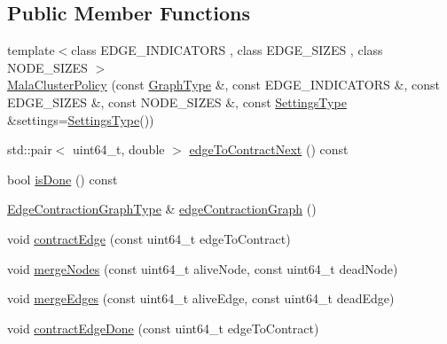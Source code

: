 \subsection*{Public Member Functions}
\begin{DoxyCompactItemize}
\item 
{\footnotesize template$<$class E\+D\+G\+E\+\_\+\+I\+N\+D\+I\+C\+A\+T\+O\+RS , class E\+D\+G\+E\+\_\+\+S\+I\+Z\+ES , class N\+O\+D\+E\+\_\+\+S\+I\+Z\+ES $>$ }\\\hyperlink{classnifty_1_1graph_1_1agglo_1_1MalaClusterPolicy_a764281b5b0b47bdec55ec8ab031100aa}{Mala\+Cluster\+Policy} (const \hyperlink{classnifty_1_1graph_1_1agglo_1_1MalaClusterPolicy_ae2696b85f3f04787282e003bead20a5d}{Graph\+Type} \&, const E\+D\+G\+E\+\_\+\+I\+N\+D\+I\+C\+A\+T\+O\+RS \&, const E\+D\+G\+E\+\_\+\+S\+I\+Z\+ES \&, const N\+O\+D\+E\+\_\+\+S\+I\+Z\+ES \&, const \hyperlink{structnifty_1_1graph_1_1agglo_1_1MalaClusterPolicy_1_1SettingsType}{Settings\+Type} \&settings=\hyperlink{structnifty_1_1graph_1_1agglo_1_1MalaClusterPolicy_1_1SettingsType}{Settings\+Type}())
\item 
std\+::pair$<$ uint64\+\_\+t, double $>$ \hyperlink{classnifty_1_1graph_1_1agglo_1_1MalaClusterPolicy_a8b87f155261b8196cad0e301af5c58dd}{edge\+To\+Contract\+Next} () const
\item 
bool \hyperlink{classnifty_1_1graph_1_1agglo_1_1MalaClusterPolicy_acc2efcd70451970202efabf07777007d}{is\+Done} () const
\item 
\hyperlink{classnifty_1_1graph_1_1agglo_1_1MalaClusterPolicy_a77a5b41304b53955aafbf214e2ad356f}{Edge\+Contraction\+Graph\+Type} \& \hyperlink{classnifty_1_1graph_1_1agglo_1_1MalaClusterPolicy_a77f322e55d36b39340ced1233b7e5852}{edge\+Contraction\+Graph} ()
\item 
void \hyperlink{classnifty_1_1graph_1_1agglo_1_1MalaClusterPolicy_a7001dcc73b1f93bcf5f2cbd1fa540dd8}{contract\+Edge} (const uint64\+\_\+t edge\+To\+Contract)
\item 
void \hyperlink{classnifty_1_1graph_1_1agglo_1_1MalaClusterPolicy_abd796017f547240be8ea4c3945a545f0}{merge\+Nodes} (const uint64\+\_\+t alive\+Node, const uint64\+\_\+t dead\+Node)
\item 
void \hyperlink{classnifty_1_1graph_1_1agglo_1_1MalaClusterPolicy_a0e6988bea57746b1395837cb0fedc10c}{merge\+Edges} (const uint64\+\_\+t alive\+Edge, const uint64\+\_\+t dead\+Edge)
\item 
void \hyperlink{classnifty_1_1graph_1_1agglo_1_1MalaClusterPolicy_a14238cc6529f3a585aef89c6a99407a1}{contract\+Edge\+Done} (const uint64\+\_\+t edge\+To\+Contract)

\end{DoxyCompactItemize}
